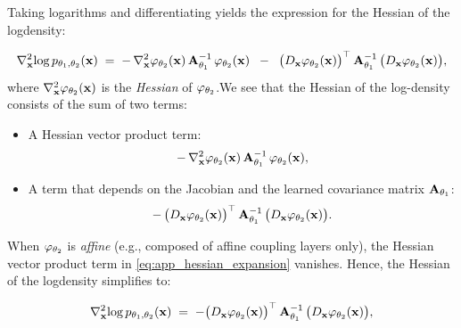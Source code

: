 \noindent Taking logarithms and differentiating yields the expression for the Hessian of the logdensity:

\begin{equation}
\label{eq:app_hessian_expansion}
    \nabla_{\mathbf{x}}^2 \!\log p_{\theta_1, \theta_2}(\mathbf{x})
    \;=\;
    -\,\nabla_{\mathbf{x}}^2 \varphi_{\theta_2}(\mathbf{x}) 
       \,\mathbf{A}_{\theta_1}^{-1}\,\varphi_{\theta_2}(\mathbf{x})
    \;\;-\;\;
    \bigl(D_{\mathbf{x}}\varphi_{\theta_2}(\mathbf{x})\bigr)^\top \,\mathbf{A}_{\theta_1}^{-1}\,\bigl(D_{\mathbf{x}}\varphi_{\theta_2}(\mathbf{x})\bigr),
\end{equation}
where \(
    \nabla_{\mathbf{x}}^2 \varphi_{\theta_2}(\mathbf{x})
\)
is the \emph{Hessian} of \(\varphi_{\theta_2}\).We see that the Hessian of the log-density consists of the sum of two terms: 
\begin{itemize}
    \item A Hessian vector product term: 
    \[
    -\,\nabla_{\mathbf{x}}^2 \varphi_{\theta_2}(\mathbf{x}) 
       \,\mathbf{A}_{\theta_1}^{-1}\,\varphi_{\theta_2}(\mathbf{x}),
    \]
    \item A term that depends on the Jacobian and the learned covariance matrix \(\mathbf{A}_{\theta_1}\):
    \[
    -\,\bigl(D_{\mathbf{x}}\varphi_{\theta_2}(\mathbf{x})\bigr)^\top \,\mathbf{A}_{\theta_1}^{-1}\,\bigl(D_{\mathbf{x}}\varphi_{\theta_2}(\mathbf{x})\bigr).
    \]
\end{itemize}

When \(\varphi_{\theta_2}\) is \emph{affine} (e.g., composed of affine coupling layers only), the Hessian vector product term in \eqref{eq:app_hessian_expansion} vanishes. Hence, the Hessian of the logdensity simplifies to:

\begin{equation}
    \label{eq:affine_app_hessian_expansion}
        \nabla_{\mathbf{x}}^2 \!\log p_{\theta_1, \theta_2}(\mathbf{x})
        \;= \; -\bigl(D_{\mathbf{x}}\varphi_{\theta_2}(\mathbf{x})\bigr)^\top \,\mathbf{A}_{\theta_1}^{-1}\,\bigl(D_{\mathbf{x}}\varphi_{\theta_2}(\mathbf{x})\bigr),
\end{equation}

